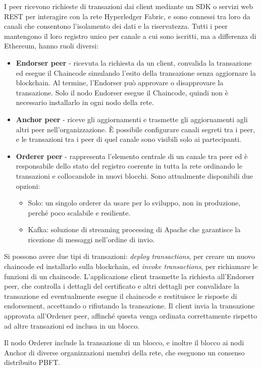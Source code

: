 I peer ricevono richieste di transazioni dai client mediante un SDK o servizi web REST per interagire con la rete Hyperledger Fabric, e sono connessi tra loro da canali che consentono l'isolamento dei dati e la riservatezza. Tutti i peer mantengono il loro registro unico per canale a cui sono iscritti, ma a differenza di Ethereum, hanno ruoli diversi:
\begin{itemize}
    \item \textbf{Endorser peer} - ricevuta la richiesta da un client, convalida la transazione ed esegue il Chaincode simulando l'esito della transazione senza aggiornare la blockchain. Al termine, l'Endorser può approvare o disapprovare la transazione. Solo il nodo Endorser esegue il Chaincode, quindi non è necessario installarlo in ogni nodo della rete.
    \item \textbf{Anchor peer} - riceve gli aggiornamenti e trasmette gli aggiornamenti agli altri peer nell'organizzazione. È possibile configurare canali segreti tra i peer, e le transazioni tra i peer di quel canale sono visibili solo ai partecipanti.
    \item \textbf{Orderer peer} - rappresenta l'elemento centrale di un canale tra peer ed è responsabile dello stato del registro coerente in tutta la rete ordinando le transazioni e collocandole in nuovi blocchi. Sono attualmente disponibili due opzioni:
    \begin{itemize}
        \item Solo: un singolo orderer da usare per lo sviluppo, non in produzione, perché poco scalabile e resiliente.
        \item Kafka: soluzione di streaming processing di Apache che garantisce la ricezione di messaggi nell'ordine di invio.
    \end{itemize}
\end{itemize}
Si possono avere due tipi di transazioni: \textit{deploy transactions}, per creare un nuovo chaincode ed installarlo sulla blockchain, ed \textit{invoke transactions}, per richiamare le funzioni di un chaincode. L'applicazione client trasmette la richiesta all'Endorser peer, che controlla i dettagli del certificato e altri dettagli per convalidare la transazione ed eventualmente esegue il chaincode e restituisce le risposte di endorsement, accettando o rifiutando la transazione. Il client invia la transazione approvata all'Ordener peer, affinché questa venga ordinata correttamente rispetto ad altre transazioni ed inclusa in un blocco.

Il nodo Orderer include la transazione di un blocco, e inoltre il blocco ai nodi Anchor di diverse organizzazioni membri della rete, che eseguono un consenso distribuito PBFT.

